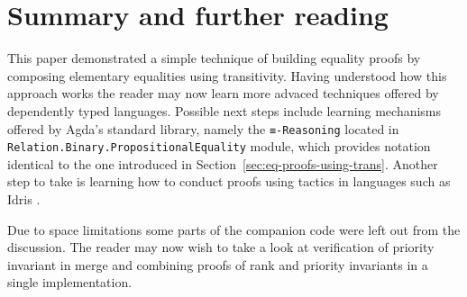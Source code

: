 \section{Summary and further reading}

This paper demonstrated a simple technique of building equality proofs by composing elementary equalities using transitivity. Having understood how this approach works the reader may now learn more advaced techniques offered by dependently typed languages. Possible next steps include learning mechanisms offered by Agda's standard library, namely the \texttt{≡-Reasoning} located in \texttt{Relation.}\texttt{Binary.}\texttt{PropositionalEquality} module, which provides notation identical to the one introduced in Section~\ref{sec:eq-proofs-using-trans}. Another step to take is learning how to conduct proofs using tactics in languages such as Idris \cite{Bra13}.

Due to space limitations some parts of the companion code were left out from the discussion. The reader may now wish to take a look at verification of priority invariant in merge and combining proofs of rank and priority invariants in a single implementation.
